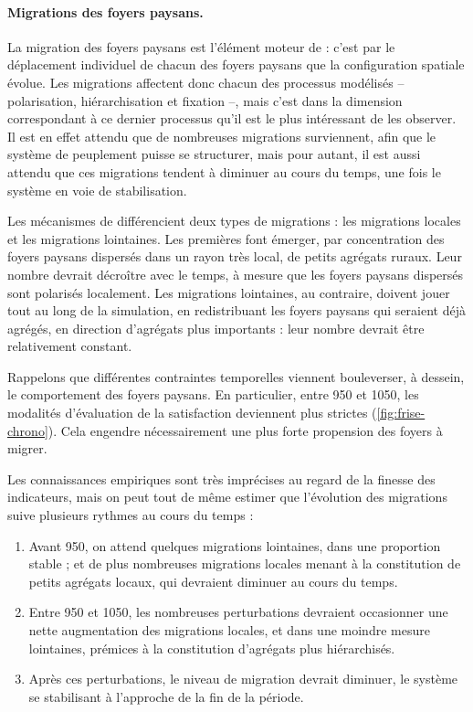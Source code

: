 \paragraph{Migrations des foyers paysans.}

La migration des foyers paysans est l'élément moteur de \simfeodal{} :
c'est par le déplacement individuel de chacun des foyers paysans que la configuration spatiale évolue.
Les migrations affectent donc chacun des processus modélisés -- polarisation, hiérarchisation et fixation --, mais c'est dans la dimension correspondant à ce dernier processus qu'il est le plus intéressant de les observer.
Il est en effet attendu que de nombreuses migrations surviennent, afin que le système de peuplement puisse se structurer, mais pour autant, il est aussi attendu que ces migrations tendent à diminuer au cours du temps, une fois le système en voie de stabilisation.

Les mécanismes de \simfeodal{} différencient deux types de migrations : les migrations locales et les migrations lointaines.
Les premières font émerger, par concentration des foyers paysans dispersés dans un rayon très local, de petits agrégats ruraux.
Leur nombre devrait décroître avec le temps, à mesure que les foyers paysans dispersés sont polarisés localement.
Les migrations lointaines, au contraire, doivent jouer tout au long de la simulation, en redistribuant les foyers paysans qui seraient déjà agrégés, en direction d'agrégats plus importants : leur nombre devrait être relativement constant.

Rappelons que différentes contraintes temporelles viennent bouleverser, à dessein, le comportement des foyers paysans.
En particulier, entre 950 et 1050, les modalités d'évaluation de la satisfaction deviennent plus strictes (\cref{fig:frise-chrono}).
Cela engendre nécessairement une plus forte propension des foyers à migrer.

Les connaissances empiriques sont très imprécises au regard de la finesse des indicateurs, mais on peut tout de même estimer que l'évolution des migrations suive plusieurs rythmes au cours du temps :
\begin{enumerate}
\item Avant 950, on attend quelques migrations lointaines, dans une proportion stable ; et de plus nombreuses migrations locales menant à la constitution de petits agrégats locaux, qui devraient diminuer au cours du temps.
\item Entre 950 et 1050, les nombreuses perturbations devraient occasionner une nette augmentation des migrations locales, et dans une moindre mesure lointaines, prémices à la constitution d'agrégats plus hiérarchisés.
\item Après ces perturbations, le niveau de migration devrait diminuer, le système se stabilisant à l'approche de la fin de la période.
\end{enumerate}


